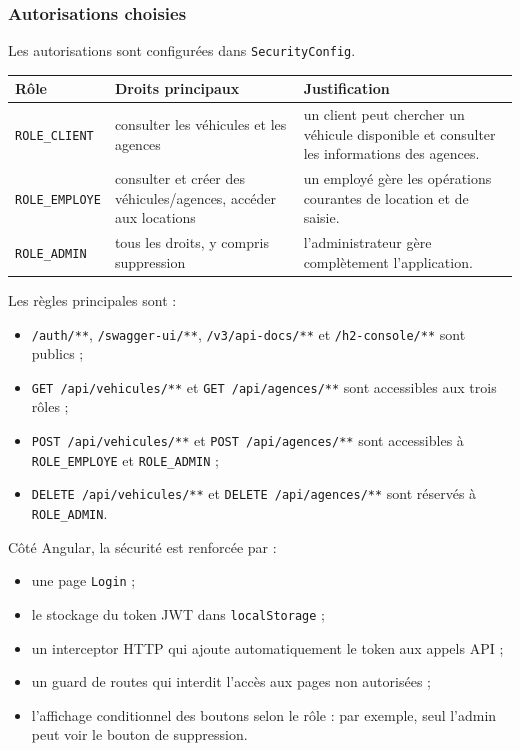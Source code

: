 \documentclass[12pt,a4paper]{article}
\newcommand{\code}[1]{\texttt{#1}}
\begin{document}
\subsubsection*{Autorisations choisies}

Les autorisations sont configurées dans \code{SecurityConfig}.

\begin{longtable}{|p{4cm}|p{5cm}|p{6cm}|}
\hline
\textbf{Rôle} & \textbf{Droits principaux} & \textbf{Justification} \\
\hline
\code{ROLE\_CLIENT} & consulter les véhicules et les agences & un client peut chercher un véhicule disponible et consulter les informations des agences. \\
\hline
\code{ROLE\_EMPLOYE} & consulter et créer des véhicules/agences, accéder aux locations & un employé gère les opérations courantes de location et de saisie. \\
\hline
\code{ROLE\_ADMIN} & tous les droits, y compris suppression & l'administrateur gère complètement l'application. \\
\hline
\end{longtable}

Les règles principales sont :

\begin{itemize}
    \item \code{/auth/**}, \code{/swagger-ui/**}, \code{/v3/api-docs/**} et \code{/h2-console/**} sont publics ;
    \item \code{GET /api/vehicules/**} et \code{GET /api/agences/**} sont accessibles aux trois rôles ;
    \item \code{POST /api/vehicules/**} et \code{POST /api/agences/**} sont accessibles à \code{ROLE\_EMPLOYE} et \code{ROLE\_ADMIN} ;
    \item \code{DELETE /api/vehicules/**} et \code{DELETE /api/agences/**} sont réservés à \code{ROLE\_ADMIN}.
\end{itemize}

Côté Angular, la sécurité est renforcée par :

\begin{itemize}
    \item une page \code{Login} ;
    \item le stockage du token JWT dans \code{localStorage} ;
    \item un interceptor HTTP qui ajoute automatiquement le token aux appels API ;
    \item un guard de routes qui interdit l'accès aux pages non autorisées ;
    \item l'affichage conditionnel des boutons selon le rôle : par exemple, seul l'admin peut voir le bouton de suppression.
\end{itemize}
\end{document}
